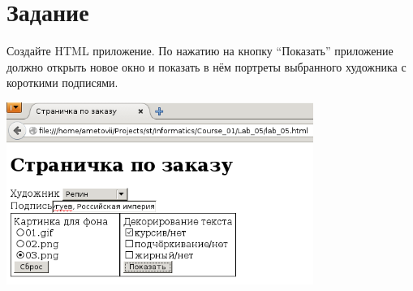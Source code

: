 \section{Задание}

Создайте HTML приложение. По нажатию на кнопку ``Показать'' приложение должно открыть новое окно и показать в нём портреты выбранного художника с короткими подписями.

\begin{center}
  \includegraphics[width=10cm]{img/01.png}


\end{center}
